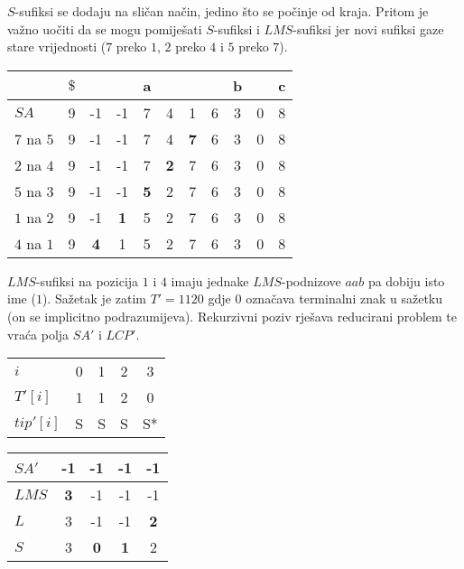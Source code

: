 \documentclass[times, utf8, proizvoljni, numeric]{fer}
\begin{document}
$S$-sufiksi se dodaju na sličan način, jedino što se počinje od kraja. Pritom je važno uočiti da se mogu pomiješati $S$-sufiksi i $LMS$-sufiksi jer novi sufiksi gaze stare vrijednosti ($7$ preko $1$, $2$ preko $4$ i $5$ preko $7$).

\begin{center}
	\begin{tabular}{l | c | c c c c c | c c c | c |}
		& $\$$ & & & a & & & & b & & c \\ \hline
		$SA$ & 9 & -1 & -1 & 7 & 4 & 1 & 6 & 3 & 0 & 8 \\ \hline
		$7$ na $5$ & 9 & -1 & -1 & 7 & 4 & \textbf{7} & 6 & 3 & 0 & 8 \\
		$2$ na $4$ & 9 & -1 & -1 & 7 & \textbf{2} & 7 & 6 & 3 & 0 & 8 \\
		$5$ na $3$ & 9 & -1 & -1 & \textbf{5} & 2 & 7 & 6 & 3 & 0 & 8 \\
		$1$ na $2$ & 9 & -1 & \textbf{1} & 5 & 2 & 7 & 6 & 3 & 0 & 8 \\
		$4$ na $1$ & 9 & \textbf{4} & 1 & 5 & 2 & 7 & 6 & 3 & 0 & 8 \\
	\end{tabular}
\end{center}

$LMS$-sufiksi na pozicija $1$ i $4$ imaju jednake $LMS$-podnizove $aab$ pa dobiju isto ime ($1$). Sažetak je zatim $T'=1120$ gdje $0$ označava terminalni znak u sažetku (on se implicitno podrazumijeva). Rekurzivni poziv rješava reducirani problem te vraća polja $SA'$ i $LCP'$.

\begin{center}
	\begin{tabular}{l | c c c c |}
		$i$ & 0 & 1 & 2 & 3 \\
		$T'[i]$ & 1 & 1 & 2 & 0 \\
		$tip'[i]$ & S & S & S & S* \\
	\end{tabular}
\end{center}

\begin{center}
	\begin{tabular}{l | c | c c | c |}
		$SA'$ & -1 & -1 & -1 & -1 \\ \hline
		$LMS$ & \textbf{3} & -1 & -1 & -1 \\
		$L$ & 3 & -1 & -1 & \textbf{2} \\
		$S$ & 3 & \textbf{0} & \textbf{1} & 2 \\ \hline
	\end{tabular}
\end{center}
\end{document}
